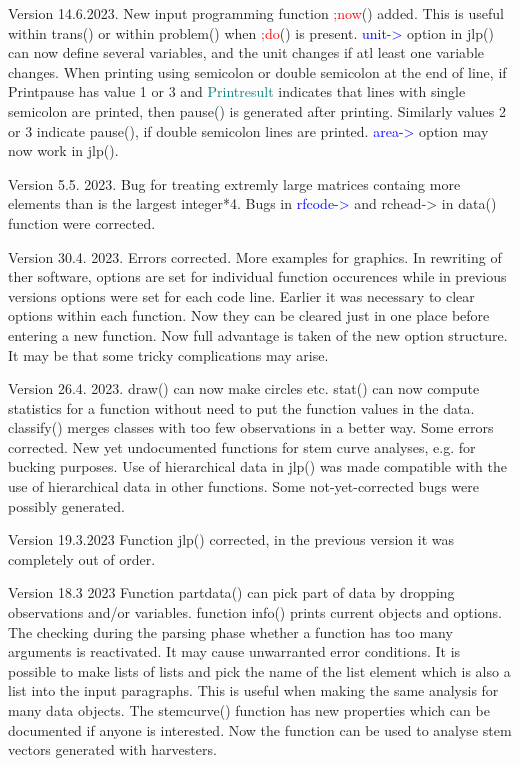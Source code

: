  
Version   14.6.2023. New input programming function \textcolor{Red}{;now}() added. This is useful 
within \textcolor{VioletRed}{trans}() or within \textcolor{VioletRed}{problem}() when \textcolor{Red}{;do}() is present. \textcolor{blue}{unit->} option in \textcolor{VioletRed}{jlp}() can now define 
several variables, and the unit changes if atl least one variable changes. 
When printing using semicolon or double semicolon at the end of line, if Printpause has value 1 or 3 and 
\textcolor{teal}{Printresult} indicates that lines with single semicolon are printed, then 
\textcolor{VioletRed}{pause}() is generated after printing. Similarly values 2 or 3 indicate \textcolor{VioletRed}{pause}(), if double semicolon lines 
are printed. \textcolor{blue}{area->} option may now work in \textcolor{VioletRed}{jlp}(). 
 
Version 5.5. 2023. Bug for treating extremly large matrices containg more elements than is the largest integer*4. 
Bugs in \textcolor{blue}{rfcode->} and rchead-> in \textcolor{VioletRed}{data}() function were corrected. 
 
Version 30.4. 2023. Errors corrected. More examples for graphics. In rewriting of ther software, 
options are set for individual function occurences while in previous versions 
options were set for each code line. Earlier it was necessary to clear options within each 
function. Now they can be cleared just in one place before entering a new function. Now 
full advantage is taken of the new option structure. It may be that some tricky complications 
may arise. 
 
Version 26.4. 2023. \textcolor{VioletRed}{draw}() can now make circles etc. \textcolor{VioletRed}{stat}() can now compute statistics 
for a function without need to put the function values in the data. \textcolor{VioletRed}{classify}() merges classes 
with too few observations in a better way. 
Some errors corrected. New yet undocumented functions for stem curve 
analyses, e.g. for bucking purposes. Use of hierarchical data in \textcolor{VioletRed}{jlp}() was made compatible 
with the use of hierarchical data in other functions. Some not-yet-corrected bugs were 
possibly generated. 
 
Version 19.3.2023 Function \textcolor{VioletRed}{jlp}() corrected, in the previous version it was 
completely out of order. 
 
Version 18.3 2023 Function \textcolor{VioletRed}{partdata}() can pick part of data by dropping 
observations and/or variables. function \textcolor{VioletRed}{info}() prints current objects and options. 
The checking during the parsing phase whether a function has too many arguments 
is reactivated. It may cause unwarranted error conditions. 
It is possible to make lists of lists and pick the name of the list element which 
is also a list into the input paragraphs. This is useful when making the same 
analysis for many data objects. The \textcolor{VioletRed}{stemcurve}() function has new properties which 
can be documented if anyone is interested. Now the function can be used to 
analyse stem vectors generated with harvesters. 
 
